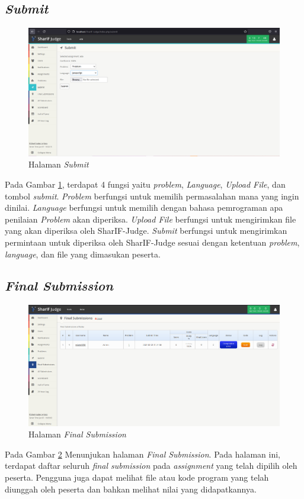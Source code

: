 \subsection{\textit{Submit}}
\label{sec: Submit}

 \begin{figure}[h!]
     \centering
     \includegraphics[width=0.9\linewidth]{Gambar/Submit_view.png}
     \caption{Halaman \textit{Submit}}
     \label{fig:Submit}
 \end{figure}
 Pada Gambar \ref{fig:Submit}, terdapat 4 fungsi yaitu \textit{problem}, \textit{Language}, \textit{Upload File}, dan tombol \textit{submit}. \textit{Problem} berfungsi untuk memilih permasalahan mana yang ingin dinilai. \textit{Language} berfungsi untuk memilih dengan bahasa pemrograman apa penilaian \textit{Problem} akan diperiksa. \textit{Upload File} berfungsi untuk mengirimkan file yang akan diperiksa oleh SharIF-Judge. \textit{Submit} berfungsi untuk mengirimkan permintaan untuk diperiksa oleh SharIF-Judge sesuai dengan ketentuan \textit{problem}, \textit{language}, dan file yang dimasukan peserta.
 
 \newpage
 \subsection{\textit{Final Submission}}
\label{sec: Final Submission}

 \begin{figure}[h!]
     \centering
     \includegraphics[width=0.9\linewidth]{Gambar/Final_Submission.png}
     \caption{Halaman \textit{Final Submission}}
     \label{fig:Submission}
 \end{figure}
 Pada Gambar \ref{fig:Submission} Menunjukan halaman \textit{Final Submission}. Pada halaman ini, terdapat daftar seluruh \textit{final submission} pada \textit{assignment} yang telah dipilih oleh peserta. Pengguna juga dapat melihat file atau kode program yang telah diunggah oleh peserta dan bahkan melihat nilai yang didapatkannya.
 

